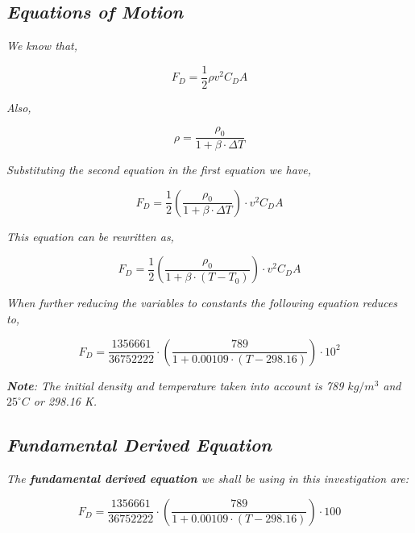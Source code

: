 
\subsection{\textit{Equations of Motion}}
            
   \textit{We know that,}
            
		$$F_D = \frac{1}{2}\rho v^2C_DA$$

	\textit{Also,}
		
		$$\rho = \frac{\rho_{0}}{1 + \beta\cdot\Delta T}$$

	\textit{Substituting the second equation in the first equation we have,}
	
		$$F_D = \frac{1}{2}\left(\frac{\rho_{0}}{1 + \beta\cdot\Delta T}\right)\cdot v^2C_DA$$

	\textit{This equation can be rewritten as,}

		$$F_D = \frac{1}{2}\left(\frac{\rho_{0}}{1 + \beta\cdot(T - T_{0})}\right)\cdot v^2C_DA$$

	\textit{When further reducing the variables to constants the following equation reduces to,}

		$$F_D = \frac{1356661}{36752222}\cdot\left(\frac{789}{1 + 0.00109\cdot(T - 298.16)}\right)\cdot 10^2$$

	\textit{\textbf{Note}: The initial density and temperature taken into account is 789 $kg/m^3$ and ${25}^\circ C$ or 298.16 K.}

\subsection{\textit{Fundamental Derived Equation}}

	\textit{The \textbf{fundamental derived equation} we shall be using in this investigation are:}
            
   	\begin{equation}
      	F_D = \frac{1356661}{36752222}\cdot\left(\frac{789}{1 + 0.00109\cdot(T - 298.16)}\right)\cdot 100
      	\label{eq1}
    	\end{equation}
            
            
            




